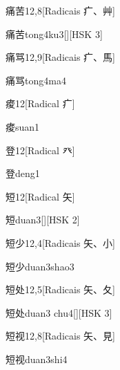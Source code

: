 \begin{entry}{痛苦}{12,8}[Radicais ⽧、⾋]
  \begin{phonetics}{痛苦}{tong4ku3}[][HSK 3]
  \end{phonetics}
\end{entry}

\begin{entry}{痛骂}{12,9}[Radicais ⽧、⾺]
  \begin{phonetics}{痛骂}{tong4ma4}
  \end{phonetics}
\end{entry}

\begin{entry}{痠}{12}[Radical ⽧]
  \begin{phonetics}{痠}{suan1}
  \end{phonetics}
\end{entry}

\begin{entry}{登}{12}[Radical ⽨]
  \begin{phonetics}{登}{deng1}
  \end{phonetics}
\end{entry}

\begin{entry}{短}{12}[Radical ⽮]
  \begin{phonetics}{短}{duan3}[][HSK 2]
  \end{phonetics}
\end{entry}

\begin{entry}{短少}{12,4}[Radicais ⽮、⼩]
  \begin{phonetics}{短少}{duan3shao3}
  \end{phonetics}
\end{entry}

\begin{entry}{短处}{12,5}[Radicais ⽮、⼡]
  \begin{phonetics}{短处}{duan3 chu4}[][HSK 3]
  \end{phonetics}
\end{entry}

\begin{entry}{短视}{12,8}[Radicais ⽮、⾒]
  \begin{phonetics}{短视}{duan3shi4}
  \end{phonetics}
\end{entry}


